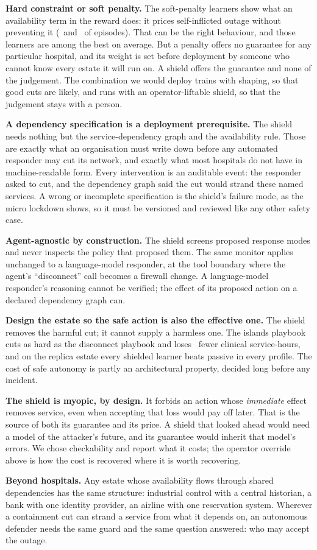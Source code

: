\textbf{Hard constraint or soft penalty.} The soft-penalty learners show
what an availability term in the reward does: it prices self-inflicted
outage without preventing it (\numQSoftTodaySelfPct\ and
\numQSoftReplicasSelfPct\ of episodes). That can be the right behaviour,
and those learners are among the best on average. But a penalty offers no
guarantee for any particular hospital, and its weight is set before
deployment by someone who cannot know every estate it will run on. A shield
offers the guarantee and none of the judgement. The combination we would
deploy trains with shaping, so that good cuts are likely, and runs with an
operator-liftable shield, so that the judgement stays with a person.

\textbf{A dependency specification is a deployment prerequisite.} The
shield needs nothing but the service-dependency graph and the availability
rule. Those are exactly what an organisation must write down before any
automated responder may cut its network, and exactly what most hospitals do
not have in machine-readable form. Every intervention is an auditable event:
the responder asked to cut, and the dependency graph said the cut would
strand these named services. A wrong or incomplete specification is the
shield's failure mode, as the micro lockdown shows, so it must be versioned
and reviewed like any other safety case.

\textbf{Agent-agnostic by construction.} The shield screens proposed
response modes and never inspects the policy that proposed them. The same
monitor applies unchanged to a language-model responder, at the tool
boundary where the agent's ``disconnect'' call becomes a firewall change.
A language-model responder's reasoning cannot be verified; the effect of its
proposed action on a declared dependency graph can.

\textbf{Design the estate so the safe action is also the effective one.}
The shield removes the harmful cut; it cannot supply a harmless one. The
islands playbook cuts as hard as the disconnect playbook and loses
\numKeyDisconnectToIslandsHoursAbs\ fewer clinical service-hours, and on the
replica estate every shielded learner beats passive in every profile. The
cost of safe autonomy is partly an architectural property, decided long
before any incident.

\textbf{The shield is myopic, by design.} It forbids an action whose
\emph{immediate} effect removes service, even when accepting that loss would
pay off later. That is the source of both its guarantee and its price. A
shield that looked ahead would need a model of the attacker's future, and
its guarantee would inherit that model's errors. We chose checkability and
report what it costs; the operator override above is how the cost is
recovered where it is worth recovering.

\textbf{Beyond hospitals.} Any estate whose availability flows through
shared dependencies has the same structure: industrial control with a
central historian, a bank with one identity provider, an airline with one
reservation system. Wherever a containment cut can strand a service from
what it depends on, an autonomous defender needs the same guard and the
same question answered: who may accept the outage.
